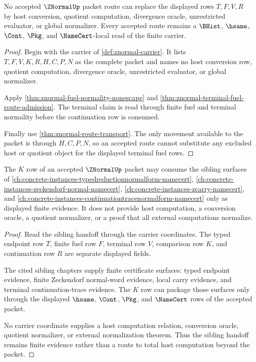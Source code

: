 \begin{theorem}
\label{thm:znormal-finite-host-boundary-refusal}
No accepted $\ZNormalUp$ packet route can replace the displayed rows $T,F,V,R$ by host conversion, quotient computation, divergence oracle, unrestricted evaluator, or global normalizer. Every accepted route remains a $\BHist$, $\hsame$, $\Cont$, $\Pkg$, and $\NameCert$-local read of the finite carrier.
\end{theorem}
\begin{proof}
Begin with the carrier of \autoref{def:znormal-carrier}. It lists $T,F,V,K,R,H,C,P,N$ as the complete packet and names no host conversion row, quotient computation, divergence oracle, unrestricted evaluator, or global normalizer.

Apply \autoref{thm:znormal-fuel-normality-nonescape} and \autoref{thm:znormal-terminal-fuel-route-admission}. The terminal claim is read through finite fuel and terminal normality before the continuation row is consumed.

Finally use \autoref{thm:znormal-route-transport}. The only movement available to the packet is through $H,C,P,N$, so an accepted route cannot substitute any excluded host or quotient object for the displayed terminal fuel rows.
\end{proof}

\begin{theorem}
\label{thm:znormal-sibling-normalword-handoff}
The $K$ row of an accepted $\ZNormalUp$ packet may consume the sibling surfaces of \autoref{ch:concrete-instances-typedreductionnormalform-namecert}, \autoref{ch:concrete-instances-zeckendorf-normal-namecert}, \autoref{ch:concrete-instances-zcarry-namecert}, and \autoref{ch:concrete-instances-continuationtracenormalform-namecert} only as displayed finite evidence. It does not provide host computation, a conversion oracle, a quotient normalizer, or a proof that all external computations normalize.
\end{theorem}
\begin{proof}
Read the sibling handoff through the carrier coordinates. The typed endpoint row $T$, finite fuel row $F$, terminal row $V$, comparison row $K$, and continuation row $R$ are separate displayed fields.

The cited sibling chapters supply finite certificate surfaces: typed endpoint evidence, finite Zeckendorf normal-word evidence, local carry evidence, and terminal continuation-trace evidence. The $K$ row can package those surfaces only through the displayed $\hsame$, $\Cont$, $\Pkg$, and $\NameCert$ rows of the accepted packet.

No carrier coordinate supplies a host computation relation, conversion oracle, quotient normalizer, or external normalization theorem. Thus the sibling handoff remains finite evidence rather than a route to total host computation beyond the packet.
\end{proof}

